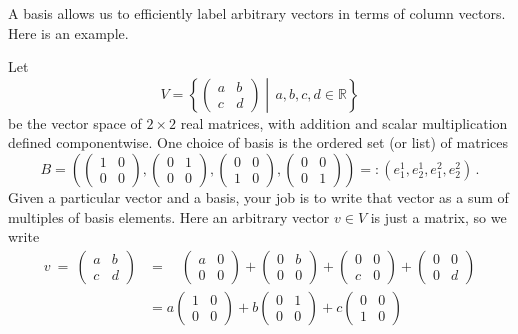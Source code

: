 \noindent
A basis allows us to efficiently label arbitrary vectors in terms of column vectors. Here is an  example.
\begin{example}
Let \[V=\left\{\begin{pmatrix}a&b\\c&d\end{pmatrix}\middle| \,a,b,c,d\in {\mathbb R}\right\}\] be the vector space of $2\times 2$ real matrices,
with addition and scalar multiplication defined componentwise. 
One choice of basis is the ordered set (or list) of matrices
\[B=\left(\begin{pmatrix}1&0\\0&0\end{pmatrix},\begin{pmatrix}0&1\\0&0\end{pmatrix},\begin{pmatrix}0&0\\ 1&0\end{pmatrix},\begin{pmatrix}0&0\\ 0&1\end{pmatrix}\right)=:(e_1^1,e_2^1,e^2_1,e^2_2)\, .\] 
Given a particular vector and a basis, your job is to write that vector as a sum of multiples of basis elements. Here
an arbitrary vector $v\in V$ is just a matrix, so we write
\begin{align*}
v\ =\ \begin{pmatrix}a&b\\c&d\end{pmatrix}
&=\quad\!\! \begin{pmatrix}a&0\\0&0\end{pmatrix}+\begin{pmatrix}0&b\\0&0\end{pmatrix}+\begin{pmatrix}0&0\\ c&0\end{pmatrix}+\begin{pmatrix}0&0\\0&d\end{pmatrix}\\[1mm]
&=a\begin{pmatrix}1&0\\0&0\end{pmatrix}+b\begin{pmatrix}0&1\\0&0\end{pmatrix}+c\begin{pmatrix}0&0\\ 1&0\end{pmatrix}

\end{align*}
\end{example}
